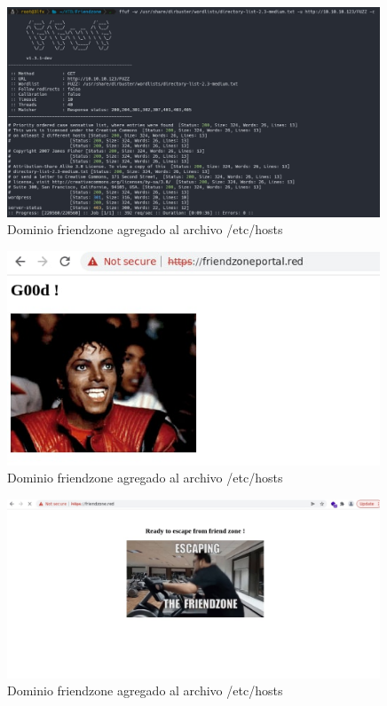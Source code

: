         \begin{figure}[H]
            \centering
            \includegraphics[width=0.99\textwidth]{informe4/imagenes/friendzone/08_ffuf.png}
            \caption{Dominio friendzone agregado al archivo /etc/hosts} 
        \end{figure}

        \begin{figure}[H]
            \centering
            \includegraphics[width=0.99\textwidth]{informe4/imagenes/friendzone/09_https_friendzoneportal.png}
            \caption{Dominio friendzone agregado al archivo /etc/hosts} 
        \end{figure}

        \begin{figure}[H]
            \centering
            \includegraphics[width=0.99\textwidth]{informe4/imagenes/friendzone/10_https_friendzone.png}
            \caption{Dominio friendzone agregado al archivo /etc/hosts} 
        \end{figure}

